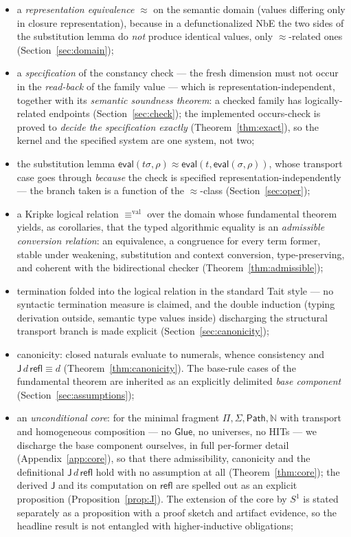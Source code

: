 \documentclass{lmcs}
\newcommand{\refl}{\mathsf{refl}}
\newcommand{\J}{\mathsf{J}}
\newcommand{\Glue}{\mathsf{Glue}}
\renewcommand{\conv}{\equiv}
\newcommand{\repeq}{\approx}
\newcommand{\valeq}{\equiv^{\mathrm{val}}}
\newcommand{\Path}{\mathsf{Path}}
\newcommand{\evalop}{\mathsf{eval}}
\begin{document}
\begin{itemize}
\item a \emph{representation equivalence} $\repeq$ on the semantic
  domain (values differing only in closure representation), because
  in a defunctionalized NbE the two sides of the substitution lemma
  do \emph{not} produce identical values, only $\repeq$-related ones
  (Section~\ref{sec:domain});
\item a \emph{specification} of the constancy check ---
  the fresh dimension must not occur in the \emph{read-back} of the
  family value --- which is representation-independent, together with
  its \emph{semantic soundness theorem}: a checked family has
  logically-related endpoints (Section~\ref{sec:check});
  the implemented occurs-check is proved to \emph{decide the
  specification exactly} (Theorem~\ref{thm:exact}), so the kernel and
  the specified system are one system, not two;
\item the substitution lemma
  $\evalop(t\sigma, \rho) \repeq \evalop(t, \evalop(\sigma,\rho))$,
  whose transport case goes through \emph{because} the check is
  specified representation-independently --- the branch taken is a
  function of the $\repeq$-class (Section~\ref{sec:oper});
\item a Kripke logical relation $\valeq$ over the domain whose
  fundamental theorem yields, as corollaries, that the typed
  algorithmic equality is an \emph{admissible conversion relation}:
  an equivalence, a congruence for every term former, stable under
  weakening, substitution and context conversion, type-preserving,
  and coherent with the bidirectional checker
  (Theorem~\ref{thm:admissible});
\item termination folded into the logical relation in the standard
  Tait style --- no syntactic termination measure is claimed, and the
  double induction (typing derivation outside, semantic type values
  inside) discharging the structural transport branch is made
  explicit (Section~\ref{sec:canonicity});
\item canonicity: closed naturals evaluate to numerals, whence
  consistency and $\J\,d\,\refl \conv d$
  (Theorem~\ref{thm:canonicity}).  The base-rule cases of the
  fundamental theorem are inherited as an explicitly delimited
  \emph{base component} (Section~\ref{sec:assumptions});
\item an \emph{unconditional core}: for the minimal fragment
  $\Pi, \Sigma, \Path, \mathbb{N}$ with transport and homogeneous
  composition --- no $\Glue$, no universes, no HITs --- we discharge
  the base component ourselves, in full per-former detail
  (Appendix~\ref{app:core}), so that there admissibility, canonicity
  and the definitional $\J\,d\,\refl$ hold with no assumption at all
  (Theorem~\ref{thm:core}); the derived $\J$ and its computation on
  $\refl$ are spelled out as an explicit proposition
  (Proposition~\ref{prop:J}).  The extension of the core by $S^1$ is
  stated separately as a proposition with a proof sketch and
  artifact evidence, so the headline result is not entangled with
  higher-inductive obligations;
\end{itemize}
\end{document}
